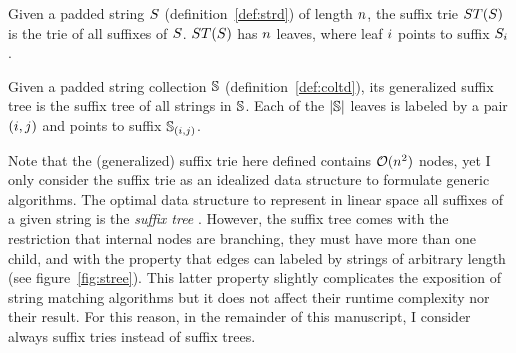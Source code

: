 
\begin{definition}
Given a padded string $S$ (definition~\ref{def:strd}) of length $n$, the suffix trie $ST(S)$ is the trie of all suffixes of $S$.
$ST(S)$ has $n$ leaves, where leaf $i$ points to suffix ${S}_{i}$.
\end{definition}

\begin{definition}
Given a padded string collection $\mathbb{S}$ (definition~\ref{def:coltd}), its generalized suffix tree is the suffix tree of all strings in $\mathbb{S}$.
Each of the $|\mathbb{S}|$ leaves is labeled by a pair $(i,j)$ and points to suffix ${\mathbb{S}}_{(i,j)}$.

\end{definition}

\begin{figure}[b]
\caption[Suffix trie and suffix tree]{Suffix trie and suffix tree of the string $\String =$ {\ttfamily ANANAS\$} .}
\label{fig:stree}
\begin{subfigure}[b]{.5\textwidth}
\begin{center}

\end{center}
\end{subfigure}%
\begin{subfigure}[b]{.5\textwidth}
\begin{center}

\vspace{6mm}
\end{center}
\end{subfigure}
\end{figure}

Note that the (generalized) suffix trie here defined contains $\mathcal{O}(n^2)$ nodes, yet I only consider the suffix trie as an idealized data structure to formulate generic algorithms.
The optimal data structure to represent in linear space all suffixes of a given string is the \emph{suffix tree} \citep{Morrison1968}.
However, the suffix tree comes with the restriction that internal nodes are branching, \ie they must have more than one child, and with the property that edges can labeled by strings of arbitrary length (see figure~\ref{fig:stree}).
This latter property slightly complicates the exposition of string matching algorithms but it does not affect their runtime complexity nor their result.
For this reason, in the remainder of this manuscript, I consider \wlogs always suffix tries instead of suffix trees.

